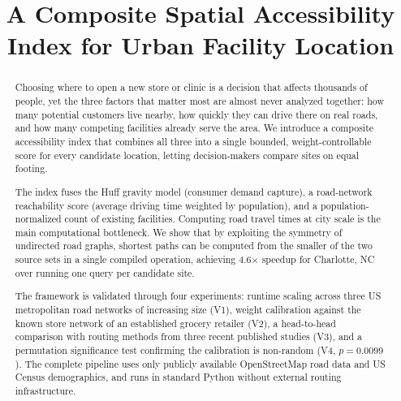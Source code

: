 \documentclass[conference]{IEEEtran}
\begin{document}
\title{A Composite Spatial Accessibility Index for Urban Facility Location}

\author{
}

\maketitle

\begin{abstract}
Choosing where to open a new store or clinic is a decision that affects
thousands of people, yet the three factors that matter most are almost
never analyzed together: how many potential customers live nearby, how
quickly they can drive there on real roads, and how many competing
facilities already serve the area.  We introduce a composite
accessibility index that combines all three into a single bounded,
weight-controllable score for every candidate location, letting
decision-makers compare sites on equal footing.

The index fuses the Huff gravity model (consumer demand capture), a
road-network reachability score (average driving time weighted by
population), and a population-normalized count of existing facilities.
Computing road travel times at city scale is the main computational
bottleneck.  We show that by exploiting the symmetry of undirected road
graphs, shortest paths can be computed from the smaller of the two
source sets in a single compiled operation, achieving 4.6$\times$ speedup
for Charlotte, NC over running one query per candidate site.

The framework is validated through four experiments: runtime scaling
across three US metropolitan road networks of increasing size (V1),
weight calibration against the known store network of an established grocery
retailer (V2), a head-to-head comparison with routing methods from three
recent published studies (V3), and a permutation significance test
confirming the calibration is non-random (V4, $p = 0.0099$).  The complete pipeline uses only publicly
available OpenStreetMap road data and US Census demographics, and runs
in standard Python without external routing infrastructure.
\end{abstract}
\end{document}
